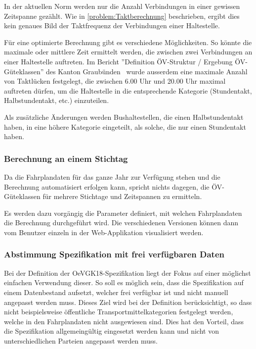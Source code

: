 In der aktuellen Norm werden nur die Anzahl Verbindungen in einer gewissen Zeitspanne gezählt.
Wie in \ref{problem:Taktberechnung} beschrieben, ergibt dies kein genaues Bild der Taktfrequenz der Verbindungen einer Haltestelle.

Für eine optimierte Berechnung gibt es verschiedene Möglichkeiten.
So könnte die maximale oder mittlere Zeit ermittelt werden, die zwischen zwei Verbindungen an einer Haltestelle auftreten.
Im Bericht ''Definition ÖV-Struktur / Ergebung ÖV-Güteklassen'' des Kanton Graubünden~\cite{oev-guteklasse-gr} wurde ausserdem eine maximale Anzahl von Taktlücken festgelegt, die zwischen 6.00 Uhr und 20.00 Uhr maximal auftreten dürfen, um die Haltestelle in die entsprechende Kategorie (Stundentakt, Halbstundentakt, etc.) einzuteilen.

Als zusätzliche Änderungen werden Bushaltestellen, die einen Halbstundentakt haben, in eine höhere Kategorie eingeteilt, als solche, die nur einen Stundentakt haben.


\subsubsection{Berechnung an einem Stichtag}
\label{solution:Berechnung an einem Stichtag}

Da die Fahrplandaten für das ganze Jahr zur Verfügung stehen und die Berechnung automatisiert erfolgen kann, spricht nichts dagegen, die \acs{ÖV}-Güteklassen für mehrere Stichtage und Zeitspannen zu ermitteln.

Es werden dazu vorgängig die Parameter definiert, mit welchen Fahrplandaten die Berechnung durchgeführt wird.
Die verschiedenen Versionen können dann vom Benutzer einzeln in der Web-Applikation visualisiert werden.

\subsubsection{Abstimmung Spezifikation mit frei verfügbaren Daten}
\label{solution:Abstimmung Spezifikation mit frei verfügbaren Daten}

Bei der Definition der \gls{OeVGK18}-Spezifikation liegt der Fokus auf einer möglichst einfachen Verwendung dieser. 
So soll es möglich sein, dass die Spezifikation auf einem Datenbestand aufsetzt, welcher frei verfügbar ist und nicht manuell angepasst werden muss.
Dieses Ziel wird bei der Definition berücksichtigt, so dass nicht beispielsweise öffentliche Transportmittelkategorien festgelegt werden, welche in den Fahrplandaten nicht ausgewiesen sind.
Dies hat den Vorteil, dass die Spezifikation allgemeingültig eingesetzt werden kann und nicht von unterschiedlichen Parteien angepasst werden muss.

